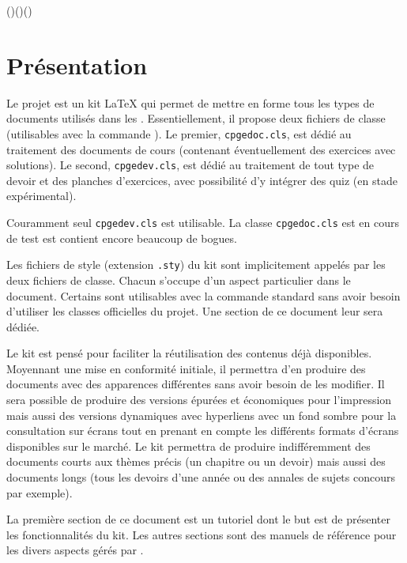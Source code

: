 \documentclass[11pt,report,oneside,solution]{cpgedev}
\let\CMD\cmd
\renewcommand\cmd[1]{{\spotcolor\CMD{#1}}}
\begin{document}
\cpgesethead()()()



\section{Présentation} 
Le projet  est un kit \LaTeX{} qui permet de mettre en forme tous les types de documents utilisés dans les . Essentiellement, il propose deux fichiers de classe (utilisables avec la commande ). Le premier, \verb+cpgedoc.cls+, est dédié au traitement des documents de cours (contenant éventuellement des exercices avec solutions). Le second, \verb+cpgedev.cls+, est dédié au traitement de tout type de devoir et des planches d'exercices, avec possibilité d'y intégrer des quiz (en stade expérimental).

\begin{nb} Couramment seul \verb+cpgedev.cls+ est utilisable. La classe \verb+cpgedoc.cls+ est en cours de test est contient encore beaucoup de bogues.
\end{nb} 

Les fichiers de style (extension \texttt{.sty}) du kit sont implicitement appelés par les deux fichiers de classe. Chacun s'occupe d'un aspect particulier dans le document. Certains sont utilisables avec la commande standard  sans avoir besoin d'utiliser les classes officielles du projet. Une section de ce document leur sera dédiée. 

Le kit est pensé pour faciliter la réutilisation des contenus déjà disponibles. Moyennant une mise en conformité initiale, il permettra d'en produire des documents avec des apparences différentes sans avoir besoin de les modifier. Il sera possible de produire des versions épurées et économiques pour l'impression mais aussi des versions dynamiques avec hyperliens avec un fond sombre pour la consultation sur écrans tout en prenant en compte les différents formats d'écrans disponibles sur le marché. Le kit permettra de produire indifféremment des documents courts aux thèmes précis (un chapitre ou un devoir) mais aussi des documents longs (tous les devoirs d'une année ou des annales de sujets concours par exemple). 

La première section de ce document est un tutoriel dont le but est de présenter les fonctionnalités du kit. Les autres sections sont des manuels de référence pour les divers aspects gérés par .  
\end{document}
